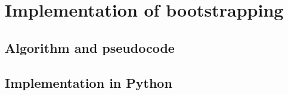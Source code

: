 
\chapter{Implementation of bootstrapping} \label{Implementation}

\section{Algorithm and pseudocode}

\section{Implementation in Python}

